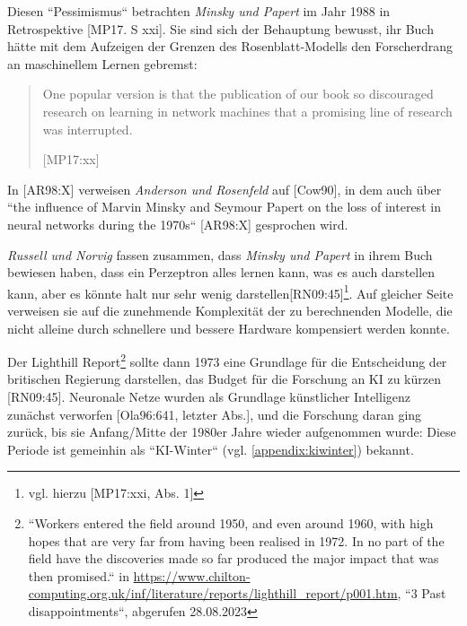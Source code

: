 \noindent
Diesen ``Pessimismus`` betrachten \textit{Minsky und Papert} im Jahr 1988 in Retrospektive [MP17. S xxi]. Sie sind sich der Behauptung bewusst, ihr Buch hätte mit dem Aufzeigen der Grenzen des Rosenblatt-Modells den Forscherdrang an maschinellem Lernen gebremst:

\blockquote[{[MP17:xx]}]{
One popular version is  that the publication of our book so discouraged research on learning in network machines that a promising line of research was interrupted.
}

\noindent
In  [AR98:X] verweisen \textit{Anderson und Rosenfeld} auf [Cow90], in dem auch über ``the influence of Marvin Minsky and Seymour Papert on the loss of interest in neural networks during the 1970s`` [AR98:X] gesprochen wird.

\textit{Russell und Norvig} fassen zusammen, dass \textit{Minsky und Papert} in ihrem Buch bewiesen haben, dass ein Perzeptron alles lernen kann, was es auch darstellen kann, aber es könnte halt nur sehr wenig darstellen[RN09:45]\footnote{
    vgl. hierzu [MP17:xxi, Abs. 1]
}. Auf gleicher Seite verweisen sie auf die zunehmende Komplexität der zu berechnenden Modelle, die nicht alleine durch schnellere und bessere Hardware kompensiert werden konnte.

Der Lighthill Report\footnote{
    ``Workers entered the field around 1950, and even around 1960, with high hopes that are very far from having been realised in 1972. In no part of the field have the discoveries made so far produced the major impact that was then promised.`` in \url{https://www.chilton-computing.org.uk/inf/literature/reports/lighthill\_report/p001.htm}, ``3 Past disappointments``, abgerufen 28.08.2023
} sollte dann 1973 eine Grundlage für die Entscheidung der britischen Regierung darstellen, das Budget für die Forschung an KI zu kürzen [RN09:45]. Neuronale Netze wurden als Grundlage künstlicher Intelligenz zunächst verworfen [Ola96:641, letzter Abs.], und die Forschung daran ging zurück, bis sie Anfang/Mitte der 1980er Jahre wieder aufgenommen wurde: Diese Periode ist gemeinhin als ``KI-Winter`` (vgl. \ref{appendix:kiwinter}) bekannt.

